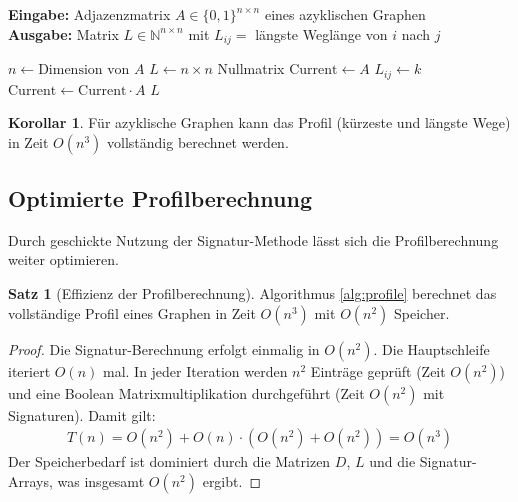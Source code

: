 ﻿\documentclass[a4paper,12pt]{article}
\theoremstyle{definition}
\newtheorem{satz}{Satz}
\newtheorem{korollar}{Korollar}
\begin{document}
	\begin{algorithm}[htb]
		\caption{Längste Wege in azyklischen Graphen}
		\label{alg:longest-paths}
		\textbf{Eingabe:} Adjazenzmatrix $A \in \{0,1\}^{n \times n}$ eines azyklischen Graphen \\
		\textbf{Ausgabe:} Matrix $L \in \mathbb{N}^{n \times n}$ mit $L_{ij} = $ längste Weglänge von $i$ nach $j$
		\begin{algorithmic}[1]
			\State $n \gets \text{Dimension von } A$
			\State $L \gets n \times n$ Nullmatrix
			\State $\text{Current} \gets A$
			\State $L_{ij} \gets k$ 
			\EndIf
			\EndFor
			\EndFor
			\State $\text{Current} \gets \text{Current} \cdot A$ 
			\EndFor
			\State \Return $L$
		\end{algorithmic}
	\end{algorithm}
	
	\begin{korollar}
		Für azyklische Graphen kann das Profil (kürzeste und längste Wege) in Zeit $O(n^3)$ vollständig berechnet werden.
	\end{korollar}
	
	\subsection{Optimierte Profilberechnung}
	Durch geschickte Nutzung der Signatur-Methode lässt sich die Profilberechnung weiter optimieren.
	
	\begin{satz}[Effizienz der Profilberechnung]
		Algorithmus \ref{alg:profile} berechnet das vollständige Profil eines Graphen in Zeit $O(n^3)$ mit $O(n^2)$ Speicher.
	\end{satz}
	
	\begin{proof}
		Die Signatur-Berechnung erfolgt einmalig in $O(n^2)$. Die Hauptschleife iteriert $O(n)$ mal. In jeder Iteration werden $n^2$ Einträge geprüft (Zeit $O(n^2)$) und eine Boolean Matrixmultiplikation durchgeführt (Zeit $O(n^2)$ mit Signaturen). Damit gilt:
		\begin{align}
			T(n) = O(n^2) + O(n) \cdot (O(n^2) + O(n^2)) = O(n^3)
		\end{align}
		Der Speicherbedarf ist dominiert durch die Matrizen $D$, $L$ und die Signatur-Arrays, was insgesamt $O(n^2)$ ergibt.
	\end{proof}
	
\end{document}
